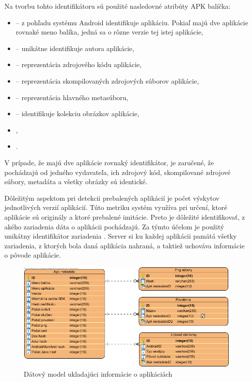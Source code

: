 \noindent Na tvorbu tohto identifikátoru sú použité nasledovné atribúty APK balíčka: 
\begin{itemize}
	\item {} -- z pohľadu systému Android identifikuje aplikáciu. Pokiaľ majú dve aplikácie rovnaké meno balíka, jedná sa o rôzne verzie tej istej aplikácie,
	\item {} -- unikátne identifikuje autora aplikácie,
	\item {} -- reprezentácia zdrojového kódu aplikácie,
	\item {} -- reprezentácia skompilovaných zdrojových súborov aplikácie,
	\item {} -- reprezentácia hlavného metasúboru,
	\item {} -- identifikuje kolekciu obrázkov aplikácie,
	\item {},
	\item {}.
\end{itemize}
V prípade, že majú dve aplikácie rovnaký identifikátor, je zaručené, že pochádzajú od jedného vydavateľa, ich zdrojový kód, skompilované zdrojové súbory, metadáta a všetky  obrázky sú identické. 

Dôležitým aspektom pri detekcii prebalených aplikácií je počet výskytov jednotlivých verzií aplikácií. Túto metriku systém využíva pri určení, ktoré aplikácie sú originály a ktoré prebalené imitácie. Preto je dôležité identifikovať, z akého zariadenia dáta o aplikácii pochádzajú. Za týmto účelom je použitý unikátny identifikátor zariadenia . Server si ku každej aplikácii pamätá všetky zariadenia, z ktorých bola daná aplikácia nahraná, a taktiež uchováva informácie o pôvode aplikácie.

\begin{figure}[htb]
  \begin{center}
    \includegraphics[width=130mm]{images/detection-db-erd.png}
  \end{center}
  \caption{Dátový model ukladajúci informácie o aplikáciách}
  \label{fig:detectionDbErd}
\end{figure}

